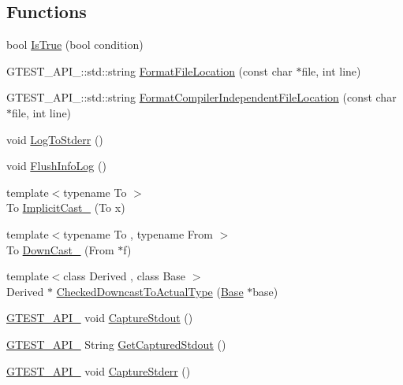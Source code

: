 \subsection*{\-Functions}
\begin{DoxyCompactItemize}
\item 
bool \hyperlink{namespacetesting_1_1internal_a68c8009eb16c787f90cd989f57fb3a9a}{\-Is\-True} (bool condition)
\item 
\-G\-T\-E\-S\-T\-\_\-\-A\-P\-I\-\_\-\-::std\-::string \hyperlink{namespacetesting_1_1internal_a6264f0605b7d7d0609eae663c58662c0}{\-Format\-File\-Location} (const char $\ast$file, int line)
\item 
\-G\-T\-E\-S\-T\-\_\-\-A\-P\-I\-\_\-\-::std\-::string \hyperlink{namespacetesting_1_1internal_ae75f0742876f6d9ba86daf5603bf2448}{\-Format\-Compiler\-Independent\-File\-Location} (const char $\ast$file, int line)
\item 
void \hyperlink{namespacetesting_1_1internal_a7d7631cb9c19962577211ac1a7a85c58}{\-Log\-To\-Stderr} ()
\item 
void \hyperlink{namespacetesting_1_1internal_ad710fa1866764bda3ad3967c16cd175f}{\-Flush\-Info\-Log} ()
\item 
{\footnotesize template$<$typename To $>$ }\\\-To \hyperlink{namespacetesting_1_1internal_a2325f52b5fc175b38659b403b1676d4b}{\-Implicit\-Cast\-\_\-} (\-To x)
\item 
{\footnotesize template$<$typename To , typename From $>$ }\\\-To \hyperlink{namespacetesting_1_1internal_a84fb993f062577fc1cef4ab3ba8c338d}{\-Down\-Cast\-\_\-} (\-From $\ast$f)
\item 
{\footnotesize template$<$class Derived , class Base $>$ }\\\-Derived $\ast$ \hyperlink{namespacetesting_1_1internal_a22ab23048d3e68df507bc066b4296c48}{\-Checked\-Downcast\-To\-Actual\-Type} (\hyperlink{classBase}{\-Base} $\ast$base)
\item 
\hyperlink{gtest-port_8h_aa73be6f0ba4a7456180a94904ce17790}{\-G\-T\-E\-S\-T\-\_\-\-A\-P\-I\-\_\-} void \hyperlink{namespacetesting_1_1internal_a718cfee4d4a208dc7ad676c595d554b2}{\-Capture\-Stdout} ()
\item 
\hyperlink{gtest-port_8h_aa73be6f0ba4a7456180a94904ce17790}{\-G\-T\-E\-S\-T\-\_\-\-A\-P\-I\-\_\-} \-String \hyperlink{namespacetesting_1_1internal_a977b8cfd6046a663886eb4e21af6a3d0}{\-Get\-Captured\-Stdout} ()
\item 
\hyperlink{gtest-port_8h_aa73be6f0ba4a7456180a94904ce17790}{\-G\-T\-E\-S\-T\-\_\-\-A\-P\-I\-\_\-} void \hyperlink{namespacetesting_1_1internal_a9d04e05ff990eeca8cb2698745f0d81b}{\-Capture\-Stderr} ()

\end{DoxyCompactItemize}
